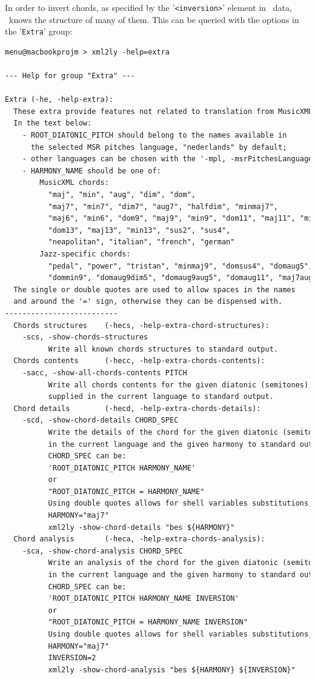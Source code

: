 \documentclass[12pt,a4paper]{article}
\begin{document}
In order to invert chords, as specified by the '{\tt <inversion>}' element in \mxml\ data, \mxmlToLy\ knows the structure of many of them. This can be queried with the options in the '{\tt Extra}' group:
\begin{lstlisting}[language=XML]
menu@macbookprojm > xml2ly -help=extra 

--- Help for group "Extra" ---

Extra (-he, -help-extra):
  These extra provide features not related to translation from MusicXML to other formats.
  In the text below:
    - ROOT_DIATONIC_PITCH should belong to the names available in
      the selected MSR pitches language, "nederlands" by default;
    - other languages can be chosen with the '-mpl, -msrPitchesLanguage' option;
    - HARMONY_NAME should be one of:
        MusicXML chords:
          "maj", "min", "aug", "dim", "dom",
          "maj7", "min7", "dim7", "aug7", "halfdim", "minmaj7",
          "maj6", "min6", "dom9", "maj9", "min9", "dom11", "maj11", "min11",
          "dom13", "maj13", "min13", "sus2", "sus4",
          "neapolitan", "italian", "french", "german"
        Jazz-specific chords:
          "pedal", "power", "tristan", "minmaj9", "domsus4", "domaug5",
          "dommin9", "domaug9dim5", "domaug9aug5", "domaug11", "maj7aug11"
  The single or double quotes are used to allow spaces in the names
  and around the '=' sign, otherwise they can be dispensed with.
--------------------------
  Chords structures    (-hecs, -help-extra-chord-structures):
    -scs, -show-chords-structures
          Write all known chords structures to standard output.
  Chords contents      (-hecc, -help-extra-chords-contents):
    -sacc, -show-all-chords-contents PITCH
          Write all chords contents for the given diatonic (semitones) PITCH,
          supplied in the current language to standard output.
  Chord details        (-hecd, -help-extra-chords-details):
    -scd, -show-chord-details CHORD_SPEC
          Write the details of the chord for the given diatonic (semitones) pitch
          in the current language and the given harmony to standard output.
          CHORD_SPEC can be:
          'ROOT_DIATONIC_PITCH HARMONY_NAME'
          or
          "ROOT_DIATONIC_PITCH = HARMONY_NAME"
          Using double quotes allows for shell variables substitutions, as in:
          HARMONY="maj7"
          xml2ly -show-chord-details "bes ${HARMONY}"
  Chord analysis       (-heca, -help-extra-chords-analysis):
    -sca, -show-chord-analysis CHORD_SPEC
          Write an analysis of the chord for the given diatonic (semitones) pitch
          in the current language and the given harmony to standard output.
          CHORD_SPEC can be:
          'ROOT_DIATONIC_PITCH HARMONY_NAME INVERSION'
          or
          "ROOT_DIATONIC_PITCH = HARMONY_NAME INVERSION"
          Using double quotes allows for shell variables substitutions, as in:
          HARMONY="maj7"
          INVERSION=2
          xml2ly -show-chord-analysis "bes ${HARMONY} ${INVERSION}"
\end{lstlisting}
\end{document}
